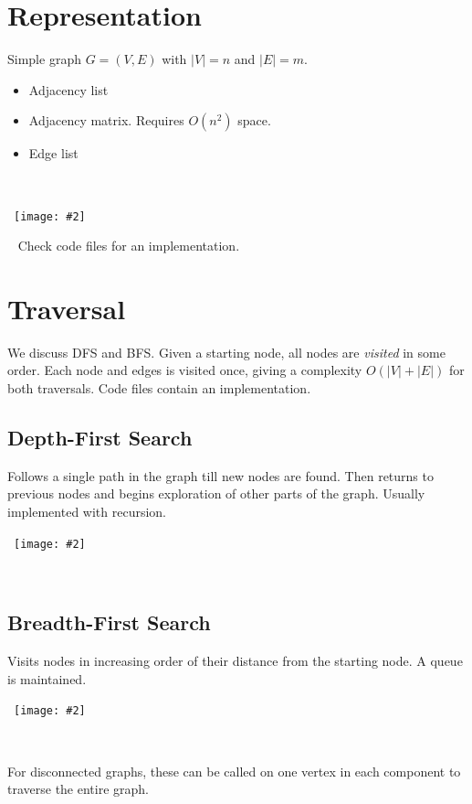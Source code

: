 \documentclass{article}
\newcommand{\I}[1]{\textit{#1}}
\newcommand{\image}[2]{\
    \begin{center}\
        \texttt{[image: \#2]}\
    \end{center}\
}
\begin{document}
\begin{sloppypar}
    \newpage

    \section{Representation}
    Simple graph $G=(V,E)$ with $|V|=n$ and $|E|=m$.
    \begin{itemize}
        \item Adjacency list
        \item Adjacency matrix. Requires $O(n^2)$ space.
        \item Edge list
    \end{itemize}
    \image{0.9}{../images/representation\_clrs.png}
    Check code files for an implementation.

    \newpage

    \section{Traversal}
    We discuss DFS and BFS. Given a starting node, all nodes are \I{visited} in some order. Each node and edges is visited once, giving a complexity $O(|V|+|E|)$ for both traversals. Code files contain an implementation.

    \subsection{Depth-First Search}
    Follows a single path in the graph till new nodes are found. Then returns to previous nodes and begins exploration of other parts of the graph. Usually implemented with recursion.
    \image{0.8}{../images/dfs.png}

    \subsection{Breadth-First Search}
    Visits nodes in increasing order of their distance from the starting node. A queue is maintained.
    \image{0.8}{../images/bfs.png}
    
    \par \noindent For disconnected graphs, these can be called on one vertex in each component to traverse the entire graph.


\end{sloppypar}
\end{document}

